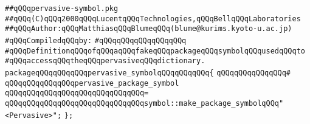 \label{src/app/makelib/main/pervasive-symbol.pkg}
\verb|##qQQqpervasive-symbol.pkg|\newline
\verb|##qQQq(C)qQQq2000qQQqLucentqQQqTechnologies,qQQqBellqQQqLaboratories|\newline
\verb|##qQQqAuthor:qQQqMatthiasqQQqBlumeqQQq(blume@kurims.kyoto-u.ac.jp)|\newline
\newline
\verb|#qQQqCompiledqQQqby:|\newline
\verb|#qQQqqQQqqQQqqQQqqQQq|\newline
\newline
\newline
\newline
\verb|#qQQqDefinitionqQQqofqQQqaqQQqfakeqQQqpackageqQQqsymbolqQQqusedqQQqto|\newline
\verb|#qQQqaccessqQQqtheqQQqpervasiveqQQqdictionary.|\newline
\newline
\newline
\newline
\verb|packageqQQqqQQqqQQqpervasive_symbolqQQqqQQqqQQq{|\newline
\verb|qQQqqQQqqQQqqQQq#|\newline
\verb|qQQqqQQqqQQqqQQqpervasive_package_symbol|\newline
\verb|qQQqqQQqqQQqqQQqqQQqqQQqqQQqqQQq=|\newline
\verb|qQQqqQQqqQQqqQQqqQQqqQQqqQQqqQQqsymbol::make_package_symbolqQQq"<Pervasive>";|\newline
\verb|};|\newline
\newline
\newline

